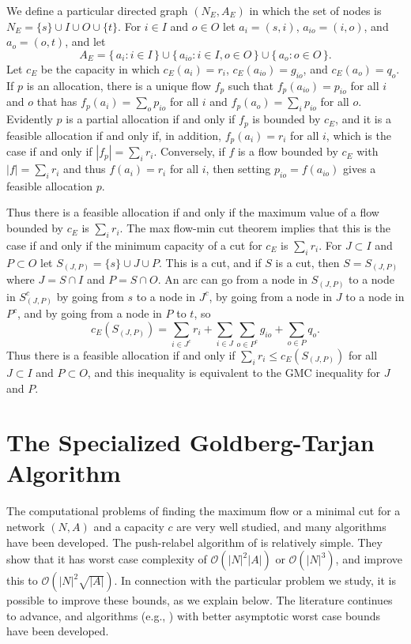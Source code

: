 \documentclass[12pt, A4paper]{article}
\theoremstyle{definition}
\newcommand{\cO}{\mathcal{O}}
\begin{document}
We define a particular directed graph $(N_E,A_E)$ in which the set of nodes is
$N_E = \{s\} \cup I \cup  O \cup \{t\}$.
For $i \in I$ and $o \in O$ let  $a_i = (s,i)$, $a_{io} = (i,o)$, and $a_o = (o,t)$, and let
$$A_E = \{\, a_i : i \in I \,\} \cup \{\, a_{io} : i \in I, o \in O \,\} \cup \{\, a_o : o \in O \,\}.$$
Let $c_E$ be the capacity in which 
$c_E(a_i) = r_i$, $c_E(a_{io}) = g_{io}$, and $c_E(a_o) = q_o$.  
If $p$ is an allocation, there is a unique flow $f_p$ such that $f_p(a_{io}) = p_{io}$ for all $i$ and $o$ that has $f_p(a_i) = \sum_o p_{io}$ for all $i$ and $f_p(a_o) = \sum_i p_{io}$ for all $o$. Evidently $p$ is a partial allocation if and only if $f_p$ is bounded by $c_E$, and it is a feasible allocation if and only if, in addition, $f_p(a_i) = r_i$ for all $i$, which is the case if and only if $|f_p| = \sum_i r_i$.  Conversely, if $f$ is a flow bounded by $c_E$ with $|f| = \sum_i r_i$ and thus $f(a_i) = r_i$ for all $i$, then setting $p_{io} = f(a_{io})$ gives a feasible allocation $p$.

Thus there is a feasible allocation if and only if the maximum value of a flow bounded by $c_E$ is $\sum_i r_i$.  The max flow-min cut theorem implies that this is the case if and only if the minimum capacity of a cut for $c_E$ is $\sum_i r_i$.  
For $J \subset I$ and $P \subset O$ let $S_{(J,P)} = \{s\} \cup J \cup P$.  This is a cut, and if $S$ is a cut, then $S = S_{(J,P)}$ where  $J = S \cap I$ and $P = S \cap O$.  An arc can go from a node in $S_{(J,P)}$ to a node in $S_{(J,P)}^c$ by going from $s$ to a node in $J^c$, by going from a node in $J$ to a node in $P^c$, and by going from a node in $P$ to $t$, so
$$c_E(S_{(J,P)}) = \sum_{i \in J^c} r_i + \sum_{i \in J} \sum_{o \in P^c} g_{io} + \sum_{o \in P} q_o.$$
Thus there is a feasible allocation if and only if $\sum_i r_i \le c_E(S_{(J,P)})$ for all $J \subset I$ and $P \subset O$, and this inequality is equivalent to the GMC inequality for $J$ and $P$.

\section{The Specialized Goldberg-Tarjan Algorithm}

The computational problems of finding the maximum flow or a minimal cut for a network $(N,A)$ and a capacity $c$ are very well studied, and many algorithms have been developed. 
The push-relabel algorithm of \cite{GoTa88} is relatively simple.  They show that it has worst case complexity of $\cO(|N|^2|A|)$ or $\cO(|N|^3)$, and \cite{ChMa05} improve this to $\cO(|N|^2\sqrt{|A|})$.  
In connection with the particular problem we study, it is possible to improve these bounds, as we explain below.  The literature continues to advance, and algorithms (e.g., \cite{CKLGS22}) with better asymptotic worst case bounds have been developed.
  
\end{document}
